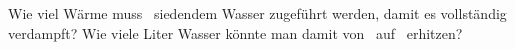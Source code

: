 Wie viel Wärme muss \VWsO\ siedendem Wasser zugeführt werden, damit es vollständig verdampft? Wie viele Liter Wasser könnte man damit von \TnO\ auf \TsO\ erhitzen?
